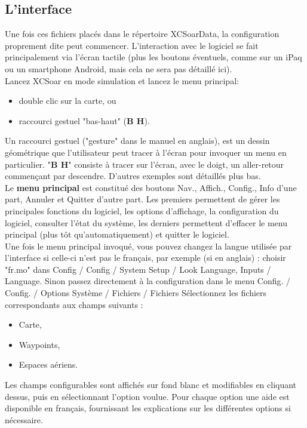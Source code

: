 \documentclass{article}
\begin{document}
\subsection{L'interface}
\noindent
%
Une fois ces fichiers placés dans le répertoire XCSoarData, la configuration proprement dite peut commencer. L'interaction avec le logiciel se fait principalement via l'écran tactile (plus les boutons éventuels, comme sur un iPaq ou un smartphone Android, mais cela ne sera pas détaillé ici).\\
Lancez XCSoar en mode simulation et lancez le menu principal:
\begin{itemize}
\item double clic sur la carte,
ou
\item raccourci gestuel "bas-haut" (\textbf{B H}).
\end{itemize}
Un raccourci gestuel ("gesture" dans le manuel en anglais), est un dessin géométrique que l'utilisateur peut tracer à l'écran pour invoquer un menu en particulier. "\textbf{B H}" consiste à tracer sur l'écran, avec le doigt, un aller-retour commençant par descendre. D'autres exemples sont détaillés plus bas.\\
%
Le \textbf{menu principal} est constitué des boutons Nav., Affich., Config., Info d'une part, Annuler et Quitter d'autre part. Les premiers permettent de gérer les principales fonctions du logiciel, les options d'affichage, la configuration du logiciel, consulter l'état du système, les derniers permettent d'effacer le menu principal (plus tôt qu'automatiquement) et quitter le logiciel.\\
%
Une fois le menu principal invoqué, vous pouvez changez la langue utilisée par l'interface si celle-ci n'est pas le français, par exemple (si en anglais) : choisir "fr.mo" dans Config / Config / System Setup / Look Language, Inputs / Language.
Sinon passez directement à la configuration dans le menu Config. / Config. / Options Système / Fichiers / Fichiers
Sélectionnez les fichiers correspondants aux champs suivants :
\begin{itemize}
\item Carte,
\item Waypoints,
\item Espaces aériens.
\end{itemize}
Les champs configurables sont affichés sur fond blanc et modifiables en cliquant dessus, puis en sélectionnant l'option voulue. Pour chaque option une aide est disponible en français, fournissant les explications sur les différentes options si nécessaire.\\
\end{document}
